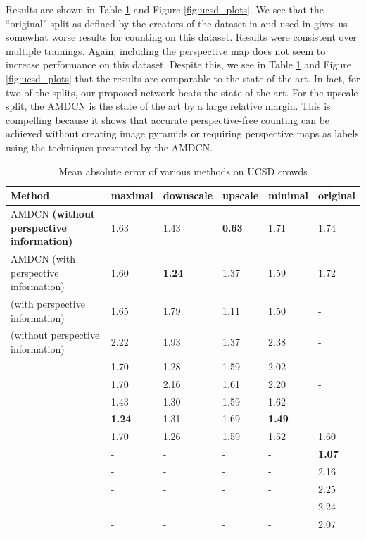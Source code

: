 \documentclass[10pt,twocolumn,letterpaper]{article}
\begin{document}
Results are shown in Table \ref{tab:ucsd} and Figure \ref{fig:ucsd_plots}. We see that the ``original'' split as defined by the creators of the dataset in \cite{chan2008privacy} and used in \cite{zhang2016single} gives us somewhat worse results for counting on this dataset. Results were consistent over multiple trainings. Again, including the perspective map does not seem to increase performance on this dataset. Despite this, we see in Table \ref{tab:ucsd} and Figure \ref{fig:ucsd_plots} that the results are comparable to the state of the art. In fact, for two of the splits, our proposed network beats the state of the art. For the upscale split, the AMDCN is the state of the art by a large relative margin. This is compelling because it shows that accurate perspective-free counting can be achieved without creating image pyramids or requiring perspective maps as labels using the techniques presented by the AMDCN.

\begin{table}
    \begin{center}
    \begin{tabular}{|p{6.5cm}|p{1.5cm}|p{1.6cm}|p{1.5cm}|p{1.5cm}|p{1.5cm}|}
        \hline
         \textbf{Method} & \textbf{maximal} & \textbf{downscale} & \textbf{upscale} & \textbf{minimal} & \textbf{original}\\\hline
         AMDCN \textbf{(without perspective information)} & 1.63 & 1.43 & \textbf{0.63} & 1.71 & 1.74\\\hline
         AMDCN (with perspective information) & 1.60 & \textbf{1.24} & 1.37 & 1.59 & 1.72\\\hline
         \cite{rubio2016} (with perspective information) & 1.65 & 1.79 & 1.11 & 1.50 & -\\\hline
         \cite{rubio2016} (without perspective information) & 2.22 & 1.93 & 1.37 & 2.38 & -\\\hline
         \cite{lempitsky2010} & 1.70 & 1.28 & 1.59 & 2.02 & -\\\hline
         \cite{fiaschi2012learning} & 1.70 & 2.16 & 1.61 & 2.20 & -\\\hline
         \cite{pham2015count} & 1.43 & 1.30 & 1.59 & 1.62 & -\\\hline
         \cite{arteta2014interactive} & \textbf{1.24} & 1.31 & 1.69 & \textbf{1.49} & -\\\hline
         \cite{zhang2015cross} & 1.70 & 1.26 & 1.59 & 1.52 & 1.60\\\hline
         \cite{zhang2016single} & - & - & - & - & \textbf{1.07}\\\hline
         \cite{an2007face, zhang2016single} & - & - & - & - & 2.16\\\hline
         \cite{chen2012feature} & - & - & - & - & 2.25\\\hline
         \cite{chan2008privacy} & - & - & - & - & 2.24\\\hline
         \cite{chen2013cumulative} & - & - & - & - & 2.07\\\hline
    \end{tabular}
    \end{center}
    \caption{Mean absolute error of various methods on UCSD crowds}
    \label{tab:ucsd}
\end{table}
\end{document}
